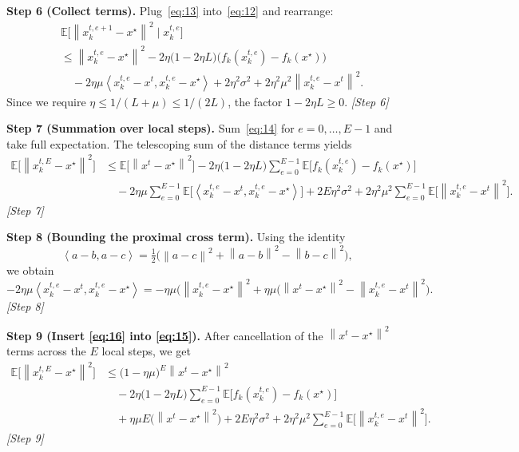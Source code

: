 \documentclass[11pt]{article}
\newcommand{\E}{\mathbb{E}}
\newcommand{\norm}[1]{\left\lVert #1\right\rVert}
\newcommand{\ip}[2]{\left\langle #1,#2\right\rangle}
\begin{document}
\noindent\textbf{Step 6 (Collect terms).}  
Plug~\eqref{eq:13} into~\eqref{eq:12} and rearrange:
\[
\begin{aligned}
&\E\!\big[\norm{x_{k}^{t,e+1}-x^{\star}}^{2}\mid x_{k}^{t,e}\big]\\
&\le \norm{x_{k}^{t,e}-x^{\star}}^{2}
-2\eta\big(1-2\eta L\big)\big(f_k(x_{k}^{t,e})-f_k(x^{\star})\big)\\
&\quad
-2\eta\mu\ip{x_{k}^{t,e}-x^{t}}{x_{k}^{t,e}-x^{\star}}
+2\eta^{2}\sigma^{2}
+2\eta^{2}\mu^{2}\norm{x_{k}^{t,e}-x^{t}}^{2}.
\end{aligned}
\tag{14}
\]
Since we require $\eta\le 1/(L+\mu)\le 1/(2L)$, the factor $1-2\eta L\ge 0$.
\hfill\textit{[Step 6]}

\noindent\textbf{Step 7 (Summation over local steps).}  
Sum~\eqref{eq:14} for $e=0,\dots,E-1$ and take full expectation.  The telescoping sum of the distance terms yields
\[
\begin{aligned}
\E\!\big[\norm{x_{k}^{t,E}-x^{\star}}^{2}\big]
&\le \E\!\big[\norm{x^{t}-x^{\star}}^{2}\big]
-2\eta\big(1-2\eta L\big)\sum_{e=0}^{E-1}\E\!\big[f_k(x_{k}^{t,e})-f_k(x^{\star})\big]\\
&\quad
-2\eta\mu\sum_{e=0}^{E-1}\E\!\big[\ip{x_{k}^{t,e}-x^{t}}{x_{k}^{t,e}-x^{\star}}\big]
+2E\eta^{2}\sigma^{2}
+2\eta^{2}\mu^{2}\sum_{e=0}^{E-1}\E\!\big[\norm{x_{k}^{t,e}-x^{t}}^{2}\big].
\end{aligned}
\tag{15}
\]
\hfill\textit{[Step 7]}

\noindent\textbf{Step 8 (Bounding the proximal cross term).}  
Using the identity
\[
\ip{a-b}{a-c}= \tfrac12\big(\norm{a-c}^{2}+\norm{a-b}^{2}-\norm{b-c}^{2}\big),
\]
we obtain
\[
-2\eta\mu\ip{x_{k}^{t,e}-x^{t}}{x_{k}^{t,e}-x^{\star}}
= -\eta\mu\big(\norm{x_{k}^{t,e}-x^{\star}}^{2}
      +\eta\mu\big(\norm{x^{t}-x^{\star}}^{2}
      -\norm{x_{k}^{t,e}-x^{t}}^{2}\big).
\tag{16}
\]
\hfill\textit{[Step 8]}

\noindent\textbf{Step 9 (Insert \eqref{eq:16} into \eqref{eq:15}).}  
After cancellation of the $\norm{x^{t}-x^{\star}}^{2}$ terms across the $E$ local steps, we get
\[
\begin{aligned}
\E\!\big[\norm{x_{k}^{t,E}-x^{\star}}^{2}\big]
&\le \big(1-\eta\mu\big)^{E}\norm{x^{t}-x^{\star}}^{2}\\
&\quad
-2\eta\big(1-2\eta L\big)\sum_{e=0}^{E-1}\E\!\big[f_k(x_{k}^{t,e})-f_k(x^{\star})\big]\\
&\quad
+\eta\mu E\big(\norm{x^{t}-x^{\star}}^{2}\big)
+2E\eta^{2}\sigma^{2}
+2\eta^{2}\mu^{2}\sum_{e=0}^{E-1}\E\!\big[\norm{x_{k}^{t,e}-x^{t}}^{2}\big].
\end{aligned}
\tag{17}
\]
\hfill\textit{[Step 9]}
\end{document}
